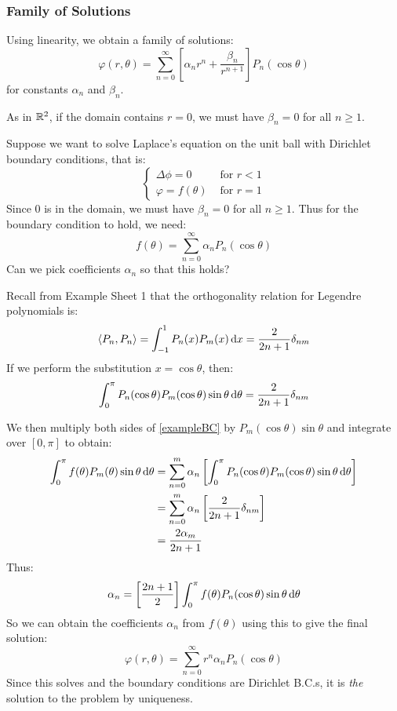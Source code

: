 \documentclass[../main.tex]{subfiles}
\begin{document}
\subsubsection{Family of Solutions}
Using linearity, we obtain a family of solutions:
\[
  \varphi(r, \theta) = \sum_{n = 0}^{\infty} \left[\alpha_n r^n + \frac{\beta_n}{r^{n + 1}}\right] P_n(\cos \theta)
\]
for constants $\alpha_n$ and $\beta_n$.
\begin{remark}
  As in $\mathbb{R}^2$, if the domain contains $r = 0$, we must have $\beta_n = 0$ for all $n \geq 1$.
\end{remark}
\begin{example}
  Suppose we want to solve Laplace's equation on the unit ball with Dirichlet boundary conditions, that is:
  \[
    \begin{cases}
    \Delta \phi = 0 & \text{ for } r < 1 \\
    \varphi = f(\theta) & \text{ for } r = 1
    \end{cases}
  \]
  Since $0$ is in the domain, we must have $\beta_n = 0$ for all $n \geq 1$.
  Thus for the boundary condition to hold, we need:
  \begin{equation}
    f(\theta) = \sum_{n = 0}^{\infty} \alpha_n P_n(\cos \theta) \label{exampleBC} \tag{\dag}
  \end{equation}
  Can we pick coefficients $\alpha_n$ so that this holds?

  Recall from Example Sheet 1 that the orthogonality relation for Legendre polynomials is:
  \[
    \langle P_n, P_n \rangle = \int_{-1}^{1} P_n(x) P_m(x) \d{x} = \frac{2}{2n + 1} \delta_{n m}
  \]
  If we perform the substitution $x = \cos \theta$, then:
  \[
    \int_{0}^{\pi} P_n(\cos \theta) P_m(\cos \theta) \sin \theta \d{\theta} = \frac{2}{2n + 1} \delta_{n m}
  \]

  We then multiply both sides of \cref{exampleBC} by $P_m(\cos \theta) \sin \theta$ and integrate over $[0, \pi]$ to obtain:
  \begin{align*}
    \int_{0}^{\pi} f(\theta) P_m(\theta) \sin \theta \d{\theta} &= \sum_{n = 0}^{m} \alpha_n \left[\int_{0}^{\pi} P_n(\cos \theta)P_m(\cos \theta) \sin \theta \d{\theta}\right] \\
                                                                &= \sum_{n = 0}^{m}\alpha_n \left[\frac{2}{2n + 1} \delta_{n m}\right] \\
                                                                &= \frac{2 \alpha_m}{2n + 1}
  \end{align*}
  Thus:
  \[
    \alpha_n = \left[\frac{2n + 1}{2}\right] \int_{0}^{\pi} f(\theta) P_n(\cos \theta) \sin \theta \d{\theta}
  \]
  So we can obtain the coefficients $\alpha_n$ from $f(\theta)$ using this to give the final solution:
  \[
    \varphi(r, \theta) = \sum_{n = 0}^{\infty} r^n \alpha_n P_n(\cos \theta)
  \]
  Since this solves and the boundary conditions are Dirichlet B.C.s, it is \textit{the} solution to the problem by uniqueness.
\end{example}
\end{document}
